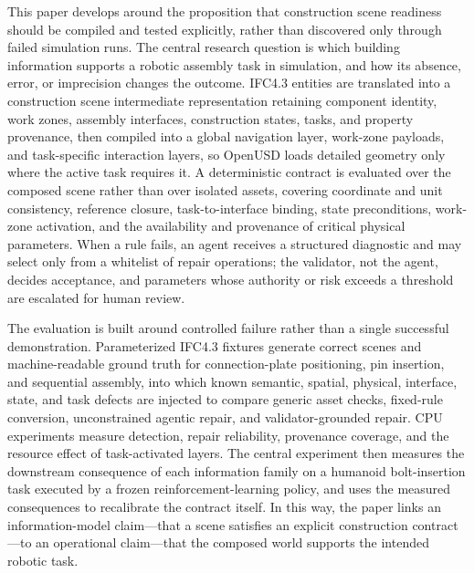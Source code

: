 This paper develops \systemname{} around the proposition that construction
scene readiness should be compiled and tested explicitly, rather than
discovered only through failed simulation runs. The central research
question is which building information supports a robotic assembly task in
simulation, and how its absence, error, or imprecision changes the outcome.
IFC4.3 entities are translated into a construction scene intermediate
representation retaining component identity, work zones, assembly
interfaces, construction states, tasks, and property provenance, then
compiled into a global navigation layer, work-zone payloads, and
task-specific interaction layers, so OpenUSD loads detailed geometry only
where the active task requires it. A deterministic contract is evaluated
over the composed scene rather than over isolated assets, covering
coordinate and unit consistency, reference closure, task-to-interface
binding, state preconditions, work-zone activation, and the availability and
provenance of critical physical parameters. When a rule fails, an agent
receives a structured diagnostic and may select only from a whitelist of
repair operations; the validator, not the agent, decides acceptance, and
parameters whose authority or risk exceeds a threshold are escalated for
human review.

The evaluation is built around controlled failure rather than a single
successful demonstration. Parameterized IFC4.3 fixtures generate correct
scenes and machine-readable ground truth for connection-plate positioning,
pin insertion, and sequential assembly, into which known semantic, spatial,
physical, interface, state, and task defects are injected to compare generic
asset checks, fixed-rule conversion, unconstrained agentic repair, and
validator-grounded repair. CPU experiments measure detection, repair
reliability, provenance coverage, and the resource effect of task-activated
layers. The central experiment then measures the downstream consequence of
each information family on a humanoid bolt-insertion task executed by a
frozen reinforcement-learning policy, and uses the measured consequences to
recalibrate the contract itself. In this way, the paper links an
information-model claim---that a scene satisfies an explicit construction
contract---to an operational claim---that the composed world supports the
intended robotic task.

